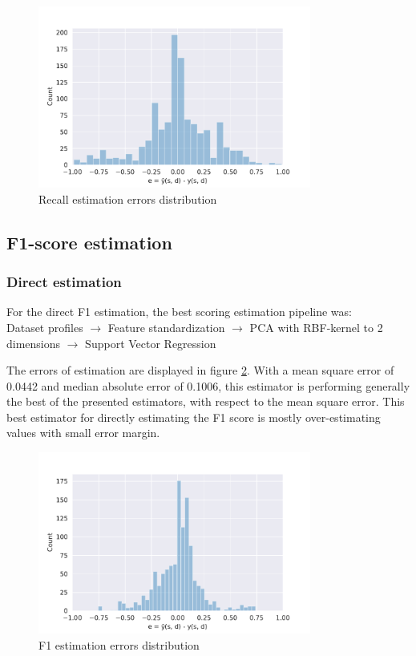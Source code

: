 \begin{figure}
    \centering
    \includegraphics[width=0.8\textwidth]{thesis/Figures/RQ2/15_error_histogramcell_rec.pdf}
    \caption{Recall estimation errors distribution}
    \label{fig:rec_estimation_errors}
\end{figure}

\subsection{F1-score estimation}
\subsubsection{Direct estimation}
For the direct F1 estimation, the best scoring estimation pipeline was:
~\\Dataset profiles $\rightarrow$ Feature standardization $\rightarrow$ PCA with RBF-kernel to 2 dimensions $\rightarrow$ Support Vector Regression

The errors of estimation are displayed in figure \ref{fig:f1_estimation_errors}. With a mean square error of 0.0442 and median absolute error of 0.1006, this estimator is performing generally the best of the presented estimators, with respect to the mean square error. This best estimator for directly estimating the F1 score is mostly over-estimating values with small error margin.  

\begin{figure}
    \centering
    \includegraphics[width=0.8\textwidth]{thesis/Figures/RQ2/15_error_histogramcell_f1.pdf}
    \caption{F1 estimation errors distribution}
    \label{fig:f1_estimation_errors}
\end{figure}

